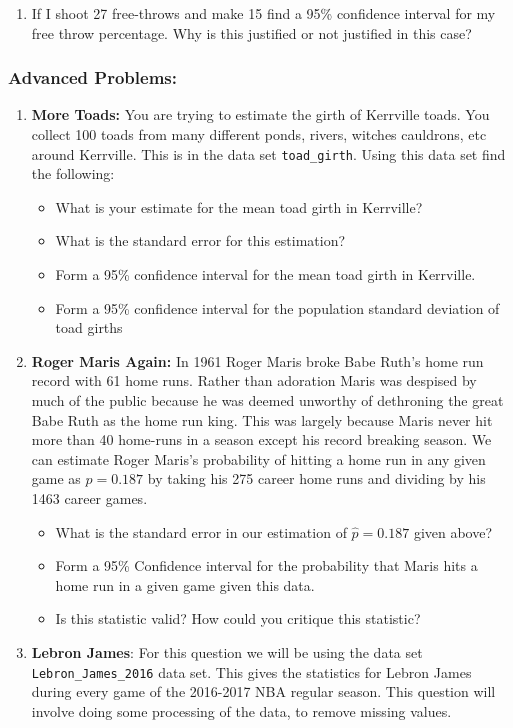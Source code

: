 \documentclass[
]{book}
\providecommand{\tightlist}{%
  \setlength{\itemsep}{0pt}\setlength{\parskip}{0pt}}
\theoremstyle{definition}
\theoremstyle{definition}
\theoremstyle{definition}
\theoremstyle{definition}
\theoremstyle{remark}
\begin{document}
\begin{enumerate}
\def\labelenumi{\arabic{enumi}.}
\setcounter{enumi}{6}
\tightlist
\item
  If I shoot 27 free-throws and make 15 find a 95\% confidence interval for my free throw percentage. Why is this justified or not justified in this case?
\end{enumerate}

\hypertarget{advanced-problems-8}{%
\subsubsection{Advanced Problems:}\label{advanced-problems-8}}

\begin{enumerate}
\def\labelenumi{\arabic{enumi}.}
\item
  \textbf{More Toads:} You are trying to estimate the girth of Kerrville toads. You collect 100 toads from many different ponds, rivers, witches cauldrons, etc around Kerrville. This is in the data set \texttt{toad\_girth}. Using this data set find the following:

  \begin{itemize}
  \tightlist
  \item
    What is your estimate for the mean toad girth in Kerrville?
  \item
    What is the standard error for this estimation?
  \item
    Form a 95\% confidence interval for the mean toad girth in Kerrville.
  \item
    Form a 95\% confidence interval for the population standard deviation of toad girths
  \end{itemize}
\item
  \textbf{Roger Maris Again:} In 1961 Roger Maris broke Babe Ruth's home run record with 61 home runs. Rather than adoration Maris was despised by much of the public because he was deemed unworthy of dethroning the great Babe Ruth as the home run king. This was largely because Maris never hit more than 40 home-runs in a season except his record breaking season. We can estimate Roger Maris's probability of hitting a home run in any given game as \(p=0.187\) by taking his 275 career home runs and dividing by his 1463 career games.

  \begin{itemize}
  \tightlist
  \item
    What is the standard error in our estimation of \(\hat{p}=0.187\) given above?
  \item
    Form a 95\% Confidence interval for the probability that Maris hits a home run in a given game given this data.
  \item
    Is this statistic valid? How could you critique this statistic?
  \end{itemize}
\item
  \textbf{Lebron James}: For this question we will be using the data set \texttt{Lebron\_James\_2016} data set. This gives the statistics for Lebron James during every game of the 2016-2017 NBA regular season. This question will involve doing some processing of the data, to remove missing values.


\end{enumerate}
\end{document}
